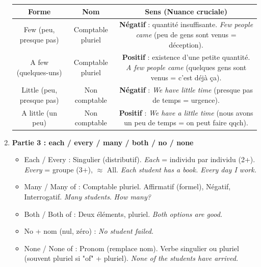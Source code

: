 \documentclass[11pt]{article}
\newcommand{\cle}[1]{{\popxbold\color{popdark}#1}}
\begin{document}
\begin{methode}
\begin{enumerate}
\begin{center}
\begin{tabular}{|c|c|c|}
                  \textbf{Forme} & \textbf{Nom} & \textbf{Sens (Nuance cruciale)} \\ \hline
                  \cle{Few} (peu, presque pas) & Comptable pluriel & \textbf{Négatif} : quantité insuffisante. \emph{Few people came} (peu de gens sont venus = déception). \\ \hline
                  \cle{A few} (quelques-uns) & Comptable pluriel & \textbf{Positif} : existence d'une petite quantité. \emph{A few people came} (quelques gens sont venus = c'est déjà ça). \\ \hline
                  \cle{Little} (peu, presque pas) & Non comptable & \textbf{Négatif} : \emph{We have \cle{little} time} (presque pas de temps = urgence). \\ \hline
                  \cle{A little} (un peu) & Non comptable & \textbf{Positif} : \emph{We have \cle{a little} time} (nous avons un peu de temps = on peut faire qqch). \\ \hline
                  \end{tabular}
              \end{center}
        \item \textbf{Partie 3 : \cle{each} / \cle{every} / \cle{many} / \cle{both} / \cle{no} / \cle{none}}
              \begin{itemize}
                  \item \cle{Each} / \cle{Every} : Singulier (distributif). \emph{Each} = individu par individu (2+). \emph{Every} = groupe (3+), $\approx$ All. \emph{Each student has a book. Every day I work.}
                  \item \cle{Many} / \cle{Many of} : Comptable pluriel. Affirmatif (formel), Négatif, Interrogatif. \emph{Many students}. \emph{How many?}
                  \item \cle{Both} / \cle{Both of} : Deux éléments, pluriel. \emph{Both options are good.}
                  \item \cle{No} + nom (nul, zéro) : \emph{No student failed.}
                  \item \cle{None} / \cle{None of} : Pronom (remplace nom). Verbe singulier ou pluriel (souvent pluriel si "of" + pluriel). \emph{None of the students \cle{have} arrived.}
              \end{itemize}
    \end{enumerate}
\end{methode}
\end{document}
